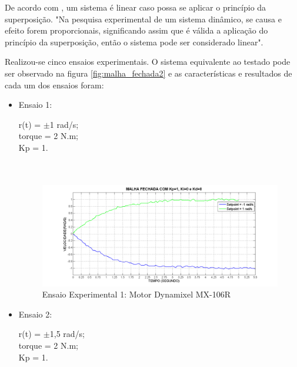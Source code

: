 \documentclass[12pt,oneside,a4paper, chapter=TITLE, section = TITLE, english, brazil]{abntex2}
\begin{document}
De acordo com , um sistema é linear caso possa se aplicar o princípio da superposição. "Na pesquisa experimental de um sistema dinâmico, se causa e efeito forem proporcionais, significando assim que é válida a aplicação do princípio da superposição, então o sistema pode ser considerado linear".

Realizou-se cinco ensaios experimentais. O sistema equivalente ao testado pode ser observado na figura \ref{fig:malha_fechada2} e as características e resultados de cada um dos ensaios foram:\\

\begin{itemize}

\item Ensaio 1:
 
r(t) = $\pm$1 rad/s;\\
torque = 2 N.m;\\
Kp = 1.\\
\\
\\

\begin{figure}[h] %
\centering
\includegraphics[scale=0.48]{./imagens/Ensaio1}
\caption[Ensaio Experimental 1: Motor Dynamixel MX-106R]{Ensaio Experimental 1: Motor Dynamixel MX-106R}
\label{fig:ensaio1}
\end{figure}


\item Ensaio 2:
 
r(t) = $\pm$1,5 rad/s;\\
torque = 2 N.m;\\
Kp = 1.\\
\\
\\
\\
\\
\\


\end{itemize}
\end{document}
